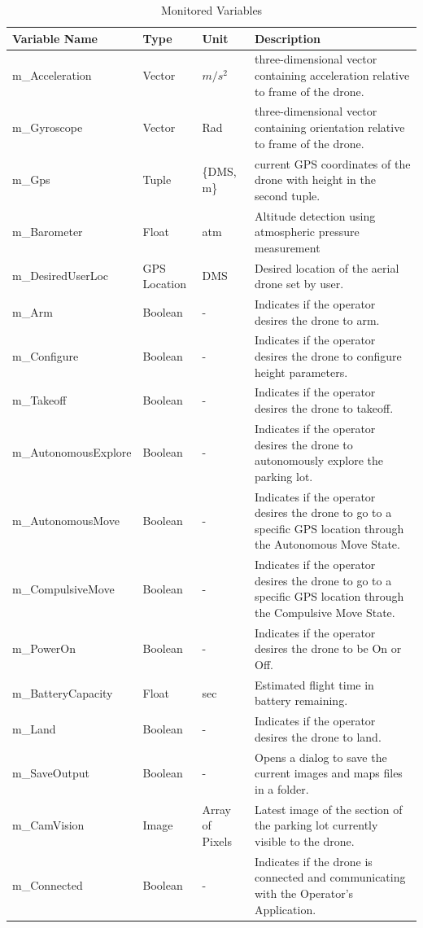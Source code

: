 \documentclass[12pt, titlepage]{article}
\begin{document}
\begin{table}[!h]
\begin{center}
\caption {Monitored Variables} \label{tab:MonitoredVars}
\begin{tabular}{ | m{3cm} | m{2cm} | m{2cm} | m{8cm} | } 
\hline
Variable Name & Type & Unit & Description \\ 
\hline
m\_Acceleration	& Vector& $m/s^2$ & three-dimensional vector containing acceleration relative to frame of the drone. \\
\hline
m\_Gyroscope & Vector	&Rad &	 three-dimensional vector containing orientation relative to frame of the drone.\\
\hline
m\_Gps	& Tuple &	\{DMS, m\} &	 current GPS coordinates of the drone with height in the second tuple.\\
\hline
m\_Barometer	& Float&	atm	 &Altitude detection using atmospheric pressure measurement\\
\hline
m\_DesiredUserLoc &	GPS Location& DMS &	 Desired location of the aerial drone set by user.\\
\hline
m\_Arm &	Boolean	 &  - &	Indicates if the operator desires the drone to arm.  \\
\hline
m\_Configure &	Boolean	 &  - &	Indicates if the operator desires the drone to configure height parameters.  \\
\hline
m\_Takeoff &	Boolean	 &  - &	Indicates if the operator desires the drone to takeoff.  \\
\hline
m\_AutonomousExplore &	Boolean &	 -	 &Indicates if the operator desires the drone to autonomously explore the parking lot.\\ 
\hline
m\_AutonomousMove &	Boolean &	 -	 & Indicates if the operator desires the drone to go to a specific GPS location through the Autonomous Move State.\\ 
\hline
m\_CompulsiveMove &	Boolean &	 -	 &Indicates if the operator desires the drone to go to a specific GPS location through the Compulsive Move State.\\ 
\hline
m\_PowerOn&	Boolean  &	- &	Indicates if the operator desires the drone to be On or Off.\\
\hline
m\_BatteryCapacity&	Float  &	sec &	Estimated flight time in battery remaining. \\
\hline
m\_Land&Boolean&	-&	Indicates if the operator desires the drone to land.\\
\hline
m\_SaveOutput&Boolean&	-&	Opens a dialog to save the current images and maps files in a folder.\\
\hline
 m\_CamVision &	Image&	Array of Pixels&	Latest image of the section of the parking lot currently visible to the drone.\\
\hline
m\_Connected & Boolean & - & Indicates if the drone is connected and communicating with the Operator's Application. \\
\hline
\end{tabular}
\end{center}
\end{table}
\end{document}
